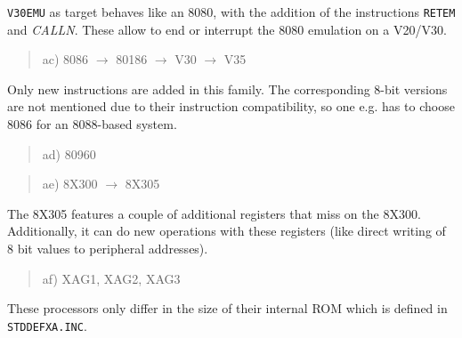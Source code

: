 \documentclass[12pt,twoside]{report}
\newcommand{\tty}[1]{{\tt #1}}
\begin{document}
{\tt V30EMU} as target behaves like an 8080, with the addition of
the instructions {\tt RETEM} and {\em CALLN}.  These allow to
end or interrupt the 8080 emulation on a V20/V30.
\begin{quote}
ac) 8086 $\rightarrow$ 80186 $\rightarrow$ V30 $\rightarrow$ V35
\end{quote}
Only new instructions are added in this family.  The corresponding
8-bit versions are not mentioned due to their instruction
compatibility, so one e.g. has to choose 8086 for an 8088-based
system.
\begin{quote}
ad) 80960
\end{quote}
\begin{quote}
ae) 8X300 $\rightarrow$ 8X305
\end{quote}
The 8X305 features a couple of additional registers that miss on the
8X300.  Additionally, it can do new operations with these registers
(like direct writing of 8 bit values to peripheral addresses).
\begin{quote}
af) XAG1, XAG2, XAG3
\end{quote}
These processors only differ in the size of their internal ROM which
is defined in \tty{STDDEFXA.INC}.
\end{document}

